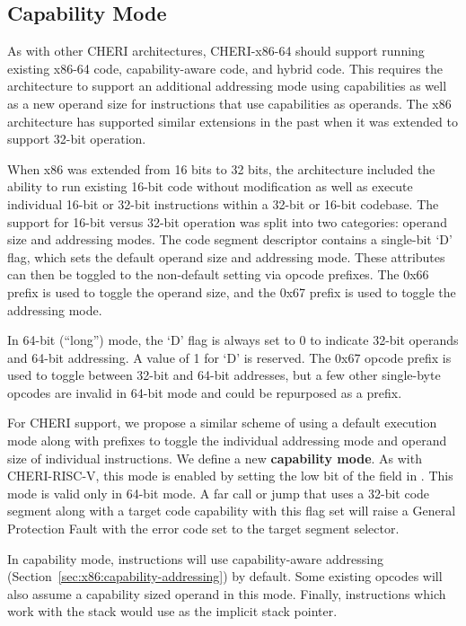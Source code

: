\subsection{Capability Mode}

As with other CHERI architectures, CHERI-x86-64 should support running existing
x86-64 code, capability-aware code, and hybrid code.  This
requires the architecture to support an additional addressing mode
using capabilities as well as a new operand size for instructions
that use capabilities as operands.
The x86 architecture has supported similar extensions in the past when it was
extended to support 32-bit operation.

When x86 was extended from 16 bits to 32 bits, the architecture
included the ability to run existing 16-bit code without modification
as well as execute individual 16-bit or 32-bit instructions within a
32-bit or 16-bit codebase.  The support for 16-bit versus 32-bit
operation was
split into two categories: operand size and addressing modes.  The
code segment descriptor contains a single-bit `D' flag, which sets the
default operand size and addressing mode.  These attributes can then
be toggled to the non-default setting via opcode prefixes.  The 0x66
prefix is used to toggle the operand size, and the 0x67 prefix is used
to toggle the addressing mode.

In 64-bit (``long'') mode, the `D' flag is always set to
0 to indicate 32-bit operands and 64-bit addressing.  A value of
1 for `D' is reserved.  The 0x67 opcode prefix is used to toggle
between 32-bit and 64-bit addresses, but a few other single-byte opcodes
are invalid in 64-bit mode and could be repurposed as a prefix.

For CHERI support, we propose a similar scheme of using a default
execution mode along with prefixes to toggle the individual addressing
mode and operand size of individual instructions.  We define a new
\textbf{capability mode}.  As with CHERI-RISC-V, this mode is enabled
by setting the low bit of the \cflags{} field in \CIP{}.  This mode is
valid only in 64-bit mode.  A far call or jump that uses a 32-bit
code segment along with a target code capability with this flag set
will raise a General Protection Fault with the error code set to the
target segment selector.

In capability mode, instructions will use capability-aware addressing
(Section~\ref{sec:x86:capability-addressing}) by default.  Some existing
opcodes will also assume a capability sized operand in this mode.
Finally, instructions which work with the stack would use \CSP{} as
the implicit stack pointer.

